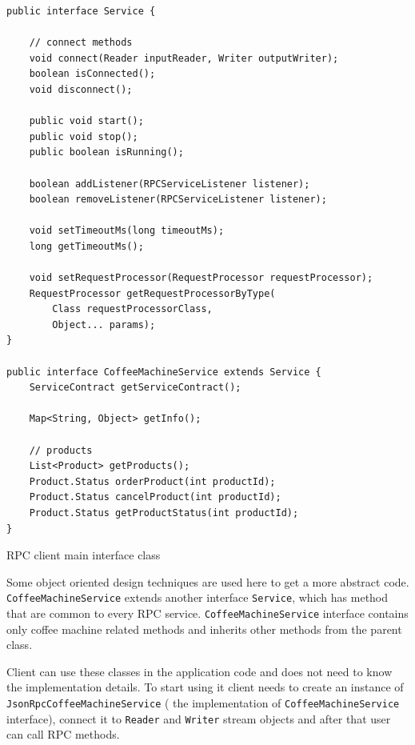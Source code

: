 \begin{listing}[H]
\begin{verbatim}
public interface Service {

    // connect methods
    void connect(Reader inputReader, Writer outputWriter);
    boolean isConnected();
    void disconnect();

    public void start();
    public void stop();
    public boolean isRunning();

    boolean addListener(RPCServiceListener listener);
    boolean removeListener(RPCServiceListener listener);

    void setTimeoutMs(long timeoutMs);
    long getTimeoutMs();

    void setRequestProcessor(RequestProcessor requestProcessor);
    RequestProcessor getRequestProcessorByType(
	    Class requestProcessorClass,
	    Object... params);
}               
               
public interface CoffeeMachineService extends Service {
    ServiceContract getServiceContract();
    
    Map<String, Object> getInfo();
    
    // products
    List<Product> getProducts();
    Product.Status orderProduct(int productId);
    Product.Status cancelProduct(int productId);
    Product.Status getProductStatus(int productId);
}
\end{verbatim}
\caption{RPC client main interface class}
\label{lst:rpc_client_interface_class}
\end{listing}

Some object oriented design techniques are used here to get a more abstract code. 
\texttt{CoffeeMachineService}  extends another
interface \texttt{Service}, which has method that are common to every RPC
service.
\texttt{CoffeeMachineService} interface contains only coffee machine related methods and
inherits other methods from the parent class.

Client can use these classes in the application code and does not need to know
the implementation details. To start using it client needs to create an instance
of \texttt{JsonRpcCoffeeMachineService} ( the implementation of
\texttt{CoffeeMachineService} interface), connect it to \texttt{Reader} and \texttt{Writer} stream objects and after that  user can call RPC methods.

